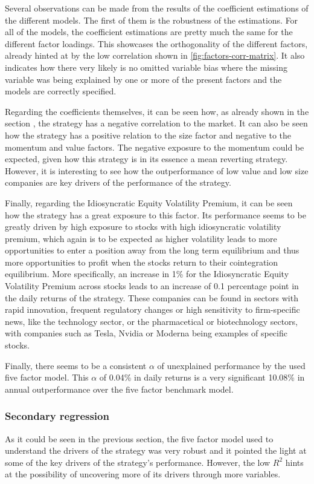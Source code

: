 Several observations can be made from the results of the coefficient estimations of the different models. The first of them is the robustness of the estimations. For all of the models, the coefficient estimations are pretty much the same for the different factor loadings. This showcases the orthogonality of the different factors, already hinted at by the low correlation shown in \autoref{fig:factors-corr-matrix}. It also indicates how there very likely is no omitted variable bias where the missing variable was being explained by one or more of the present factors and the models are correctly specified.

Regarding the coefficients themselves, it can be seen how, as already shown in the section , the strategy has a negative correlation to the market. It can also be seen how the strategy has a positive relation to the size factor and negative to the momentum and value factors. The negative exposure to the momentum could be expected, given how this strategy is in its essence a mean reverting strategy. However, it is interesting to see how the outperformance of low value and low size companies are key drivers of the performance of the strategy. 

Finally, regarding the Idiosyncratic Equity Volatility Premium, it can be seen how the strategy has a great exposure to this factor. Its performance seems to be greatly driven by high exposure to stocks with high idiosyncratic volatility premium, which again is to be expected as higher volatility leads to more opportunities to enter a position away from the long term equilibrium and thus more opportunities to profit when the stocks return to their cointegration equilibrium. More specifically, an increase in 1\% for the Idiosyncratic Equity Volatility Premium across stocks leads to an increase of 0.1 percentage point in the daily returns of the strategy. These companies can be found in sectors with rapid innovation, frequent regulatory changes or high sensitivity to firm-specific news, like the technology sector, or the pharmacetical or biotechnology sectors, with companies such as Tesla, Nvidia or Moderna being examples of specific stocks. 

Finally, there seems to be a consistent $\alpha$ of unexplained performance by the used five factor model. This $\alpha$ of 0.04\% in daily returns is a very significant 10.08\% in annual outperformance over the five factor benchmark model. 

\subsubsection{Secondary regression}
As it could be seen in the previous section, the five factor model used to understand the drivers of the strategy was very robust and it pointed the light at some of the key drivers of the strategy's performance. However, the low $R^2$ hints at the possibility of uncovering more of its drivers through more variables. 


